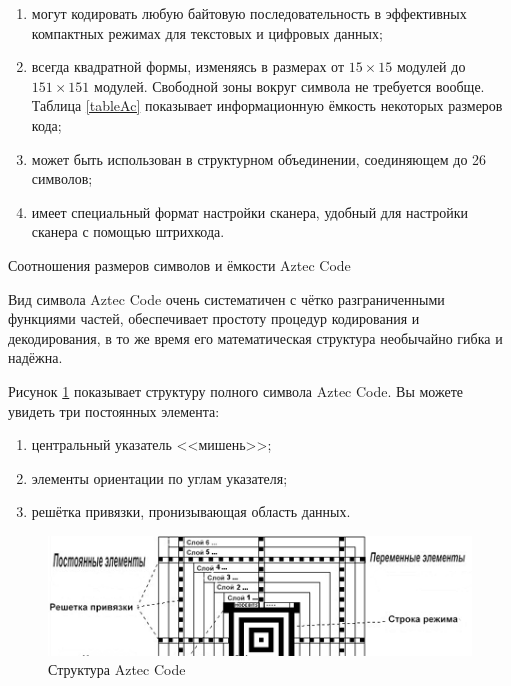\begin{enumerate}
\item могут кодировать любую байтовую последовательность в эффективных 
компактных режимах для текстовых и цифровых данных;

\item всегда квадратной формы, изменяясь в размерах от $15 \times 15$ 
модулей до $151 \times 151$ модулей. Свободной зоны вокруг символа не 
требуется вообще. Таблица \ref{tableAc} показывает информационную ёмкость 
некоторых размеров кода;

\item может быть использован в структурном объединении, соединяющем 
до 26 символов;

\item имеет специальный формат настройки сканера, удобный для 
настройки сканера с помощью штрихкода. 
 
\end{enumerate}

\begin{table}[htb]
\centering
\caption{Соотношения размеров символов и ёмкости Aztec Code}
\label{tableAc}
\end{table}

Вид символа Aztec Code очень систематичен с чётко разграниченными 
функциями частей, обеспечивает простоту процедур кодирования и 
декодирования, в то же время его математическая структура необычайно 
гибка и надёжна.

Рисунок \ref{fig:acStruct} показывает структуру полного символа 
Aztec Code. Вы можете увидеть три постоянных элемента:

\begin{enumerate}
\item центральный указатель <<мишень>>;

\item элементы ориентации по углам указателя;

\item решётка привязки, пронизывающая область данных.

\end{enumerate} 

\begin{figure}[htb]
    \centering
    \includegraphics[scale=0.8]{img/ac_struct}
    \caption{Структура Aztec Code}
    \label{fig:acStruct}
\end{figure}
 
